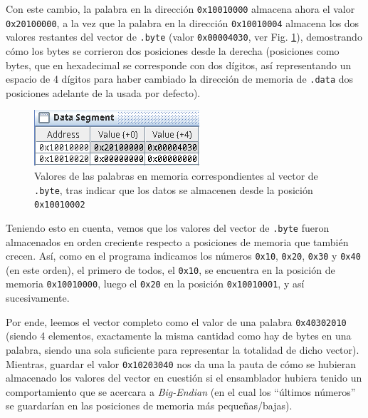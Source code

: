 \documentclass[a4paper]{report}
\begin{document}
\vspace{7pt}
\inputminted[linenos]{mips}{src/cuestiones/c1-10.asm}
\vspace{7pt}

Con este cambio, la palabra en la dirección \texttt{0x10010000} almacena ahora el valor \texttt{0x20100000}, a la vez que la palabra en la dirección \texttt{0x10010004} almacena los dos valores restantes del vector de \texttt{.byte} (valor \texttt{0x00004030}, ver Fig. \ref{fig:bytes-shift-endian}), demostrando cómo los bytes se corrieron dos posiciones desde la derecha (posiciones como bytes, que en hexadecimal se corresponde con dos dígitos, así representando un espacio de 4 dígitos para haber cambiado la dirección de memoria de \texttt{.data} dos posiciones adelante de la usada por defecto).

\begin{figure}[h]
    \centering
    \captionsetup{justification = centering}
    \includegraphics[width=.4\linewidth]{img/c1-10}
    \caption{Valores de las palabras en memoria correspondientes al vector de \texttt{.byte}, tras indicar que los datos se almacenen desde la posición \texttt{0x10010002}}
    \label{fig:bytes-shift-endian}
\end{figure}

Teniendo esto en cuenta, vemos que los valores del vector de \texttt{.byte} fueron almacenados en orden creciente respecto a posiciones de memoria que también crecen. Así, como en el programa indicamos los números \texttt{0x10}, \texttt{0x20}, \texttt{0x30} y \texttt{0x40} (en este orden), el primero de todos, el \texttt{0x10}, se encuentra en la posición de memoria \texttt{0x10010000}, luego el \texttt{0x20} en la posición \texttt{0x10010001}, y así sucesivamente.

Por ende, leemos el vector completo como el valor de una palabra \texttt{0x40302010} (siendo 4 elementos, exactamente la misma cantidad como hay de bytes en una palabra, siendo una sola suficiente para representar la totalidad de dicho vector). Mientras, guardar el valor \texttt{0x10203040} nos da una la pauta de cómo se hubieran almacenado los valores del vector en cuestión si el ensamblador hubiera tenido un comportamiento que se acercara a \textit{Big-Endian} (en el cual los ``últimos números'' se guardarían en las posiciones de memoria más pequeñas/bajas).
\end{document}
